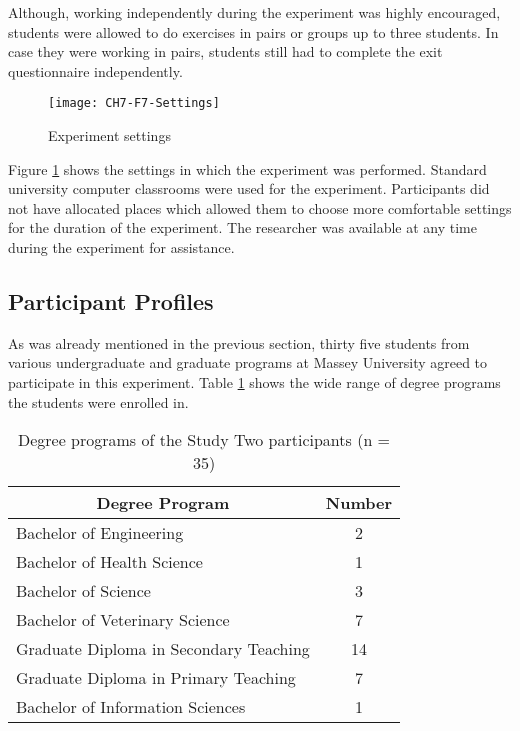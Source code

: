 Although, working independently during the experiment was highly encouraged,
students were allowed to do exercises in pairs or groups up to three students.
In case they were working in pairs, students still had to complete the exit
questionnaire independently.

\begin{figure}[htb]
\centering
\texttt{[image: CH7-F7-Settings]}
\caption{Experiment settings}
\label{fig:settings}
\end{figure}

Figure \ref{fig:settings} shows the settings in which the experiment was
performed. Standard university computer classrooms were used for the experiment.
Participants did not have allocated places which allowed them to choose more
comfortable settings for the duration of the experiment. The researcher was
available at any time during the experiment for assistance.

\subsection{Participant Profiles}

As was already mentioned in the previous section, thirty five students from
various undergraduate and graduate programs at Massey University agreed to
participate in this experiment. Table \ref{tab:degree} shows the wide range of
degree programs the students were enrolled in.

\begin{table}[htb]
  \caption{Degree programs of the Study Two participants (n = 35)}
  \begin{center}
    \begin{tabular}{| l | c |}
    \hline
     \multicolumn{1}{|c|}{\textbf{Degree Program}} &
     \multicolumn{1}{c|}{\textbf{Number}} \\
     \hline
     Bachelor of Engineering & 2 \\ \hline
     Bachelor of Health Science & 1 \\ \hline
     Bachelor of Science & 3 \\ \hline
     Bachelor of Veterinary Science & 7 \\ \hline
     Graduate Diploma in Secondary Teaching & 14 \\ \hline
     Graduate Diploma in Primary Teaching & 7 \\ \hline
     Bachelor of Information Sciences & 1 \\ \hline
    \end{tabular}
  \end{center}
  \label{tab:degree}
\end{table}

